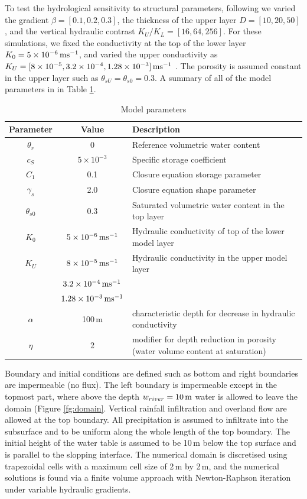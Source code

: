 \documentclass[hess, manuscript]{copernicus}
\begin{document}
To test the hydrological sensitivity to structural parameters, following \cite{roques-etal-2022} we varied the gradient $\beta = [0.1, 0.2, 0.3]$, the thickness of the upper layer $D = [10, 20, 50]$, and the vertical hydraulic contrast $K_{U}/K_{L} = [16, 64, 256]$. For these simulations, we fixed the conductivity at the top of the lower layer $K_{0} = 5\times 10^{-6}\rm\,ms^{-1}$, and varied the upper conductivity as $K_{U} = [8\times 10^{-5}, 3.2\times 10^{-4}, 1.28\times 10^{-3}]\rm\,ms^{-1}$ . The porosity is assumed constant in the upper layer such as $\theta_{sU} = \theta_{s0} = 0.3$. A summary of all of the model parameters in in Table \ref{tb:parameters}.

\begin{table}
\caption{Model parameters}
\label{tb:parameters}
\begin{tabular}{c|c|l}
\toprule
Parameter & Value & Description \\
\hline
$\theta_{r}$ & 0 & Reference volumetric water content \\
$c_{S}$ & $5\times10^{-3}$ & Specific storage coefficient \\
$C_{1}$ & 0.1 & Closure equation storage parameter \\
$\gamma_{s}$ & 2.0 & Closure equation shape parameter \\
\hline
$\theta_{s0}$ & 0.3  & Saturated volumetric water content in the top layer \\
$K_{0}$ & $5\times 10^{-6}\rm\,ms^{-1}$ & Hydraulic conductivity of top of the lower model layer \\
$K_{U}$ & $8\times 10^{-5}\rm\,ms^{-1}$ & Hydraulic conductivity in the upper model layer \\
 & $3.2\times 10^{-4}\rm\,ms^{-1}$ & \\
 & $1.28\times 10^{-3}\rm\,ms^{-1}$ & \\
$\alpha$ & 100\,m & characteristic depth for decrease in hydraulic conductivity \\
$\eta$ & 2 & modifier for depth reduction in porosity (water volume content at saturation) \\
\end{tabular}
\end{table}

Boundary and initial conditions are defined such as bottom and right boundaries are impermeable (no flux). The left boundary is impermeable except in the topmost part, where above the depth $w_{river} = 10\rm\,m$ water is allowed to leave the domain (Figure \ref{fg:domain}. Vertical rainfall infiltration and overland flow are allowed at the top boundary. All precipitation is assumed to infiltrate into the subsurface and to be uniform along the whole length of the top boundary. The initial height of the water table is assumed to be 10\,m below the top surface and is parallel to the slopping interface. The numerical domain is discretised using trapezoidal cells with a maximum cell size of 2\,m by 2\,m, and the numerical solutions is found via a finite volume approach with Newton-Raphson iteration under variable hydraulic gradients.
\end{document}
